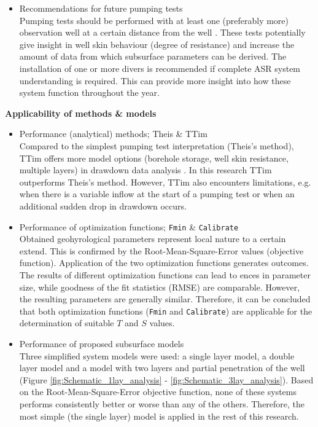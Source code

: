\begin{itemize}
\item{Recommendations for future pumping tests} \\
Pumping tests should be performed with at least one (preferably more) observation well at a certain distance from the well \citep{Kruseman2000}. These tests potentially give insight in well skin behaviour (degree of resistance) and increase the amount of data from which subsurface parameters can be derived. The installation of one or more divers is recommended if complete ASR system understanding is required. This can provide more insight into how these system function throughout the year.

\end{itemize}

\textbf{Applicability of methods \& models}
\begin{itemize}
\item{Performance (analytical) methods; Theis \& TTim} \\
Compared to the simplest pumping test interpretation (Theis's method), TTim offers more model options (borehole storage, well skin resistance, multiple layers) in drawdown data analysis \citep{Mishra2013,Bakker2013}. In this research TTim outperforms Theis's method. However, TTim also encounters limitations, e.g. when there is a variable inflow at the start of a pumping test or when an additional sudden drop in drawdown occurs. 

\item{Performance of optimization functions; \texttt{Fmin} \& \texttt{Calibrate}} \\
Obtained geohyrological parameters represent local nature to a certain extend. This is confirmed by the Root-Mean-Square-Error values (objective function). Application of the two optimization functions generates outcomes. The results of different optimization functions can lead to ences in parameter size, while goodness of the fit statistics (RMSE) are comparable. However, the resulting parameters are generally similar. Therefore, it can be concluded that both optimization functions (\texttt{Fmin} and \texttt{Calibrate}) are applicable for the determination of suitable $T$ and $S$ values. 

\item{Performance of proposed subsurface models}  \\
Three simplified system models were used: a single layer model, a double layer model and a model with two layers and partial penetration of the well (Figure \ref{fig:Schematic_1lay_analysis} - \ref{fig:Schematic_3lay_analysis}). Based on the Root-Mean-Square-Error objective function, none of these systems performs consistently better or worse than any of the others. Therefore, the most simple (the single layer) model is applied in the rest of this research.
\end{itemize}

